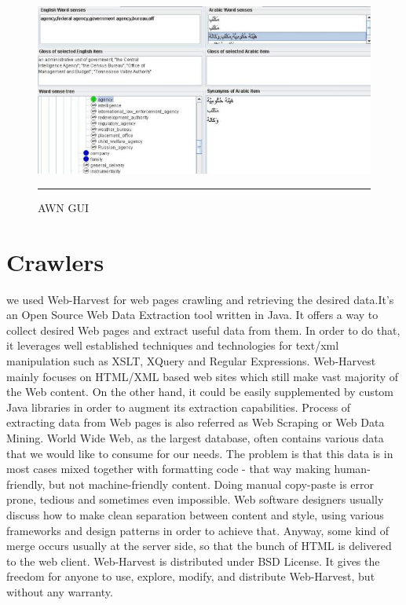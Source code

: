 \begin{figure}[htbp]
	\begin{center}
		\includegraphics{./Figures/AWNGUI_1.jpg}
		\rule{20em}{0.5pt}
	\end{center}
	\caption[AWN GUI]{AWN GUI}
	\label{fig:AWN GUI}
\end{figure}

\section{Crawlers}\label{crawlers}
we used Web-Harvest for web pages crawling and retrieving the desired data.It’s an Open Source Web Data Extraction tool written in Java. It offers a way to collect desired Web pages and extract useful data from them. In order to do that, it leverages well established techniques and technologies for text/xml manipulation such as XSLT, XQuery and Regular Expressions. Web-Harvest mainly focuses on HTML/XML based web sites which still make vast majority of the Web content. On the other hand, it could be easily supplemented by custom Java libraries in order to augment its extraction capabilities.
Process of extracting data from Web pages is also referred as Web Scraping or Web Data Mining. World Wide Web, as the largest database, often contains various data that we would like to consume for our needs. The problem is that this data is in most cases mixed together with formatting code - that way making human-friendly, but not machine-friendly content. Doing manual copy-paste is error prone, tedious and sometimes even impossible. Web software designers usually discuss how to make clean separation between content and style, using various frameworks and design patterns in order to achieve that. Anyway, some kind of merge occurs usually at the server side, so that the bunch of HTML is delivered to the web client.
Web-Harvest is distributed under BSD License. It gives the freedom for anyone to use, explore, modify, and distribute Web-Harvest, but without any warranty. 
